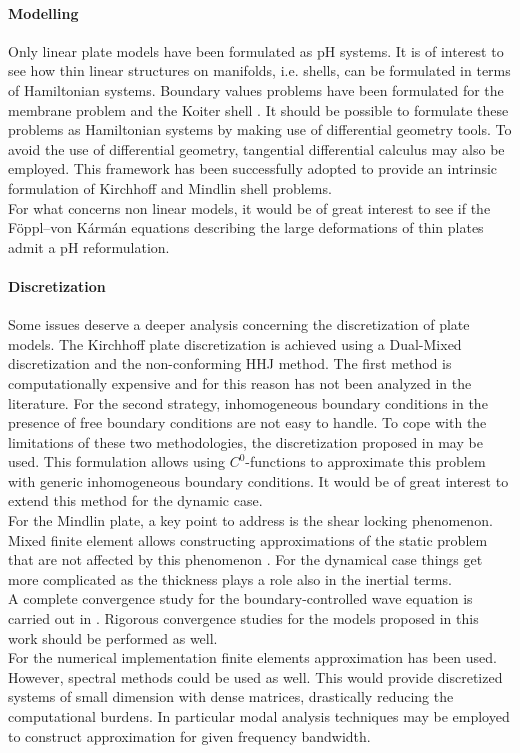 \paragraph{Modelling}
Only linear plate models have been formulated as pH systems. It is of interest to see how thin linear structures on manifolds, i.e. shells, can be formulated in terms of Hamiltonian systems. Boundary values problems have been formulated for the membrane problem and the Koiter shell \cite{ciarlet2000shells}. It should be possible to formulate these problems as Hamiltonian systems by making use of differential geometry tools. To avoid the use of differential geometry, tangential differential calculus \cite{delfour2011shapes} may also be employed. This framework has been successfully adopted to provide an intrinsic formulation of Kirchhoff \cite{schollhammer2019kirchhoff} and Mindlin \cite{schollhammer2019reissner} shell problems. \\
For what concerns non linear models, it would be of great interest to see if the F\"oppl–von K\'arm\'an equations describing the large deformations of thin plates \cite{bilbao2015conservative} admit a pH reformulation. \\


\paragraph{Discretization}
Some issues deserve a deeper analysis concerning the discretization of plate models. The Kirchhoff plate discretization is achieved using a Dual-Mixed discretization and the non-conforming HHJ method. The first method is computationally expensive and for this reason has not been analyzed in the literature. For the second strategy, inhomogeneous boundary conditions in the presence of free boundary conditions are not easy to handle. To cope with the limitations of these two methodologies, the discretization proposed in \cite{rafetseder2018siam} may be used.  This formulation allows using $C^0$-functions to approximate this problem with generic inhomogeneous boundary conditions. It would be of great interest to extend this method for the dynamic case. \\ For the Mindlin plate, a key point to address is the shear locking phenomenon. Mixed finite element allows constructing approximations of the static problem that are not affected by this phenomenon \cite{veiga2013}. For the dynamical case things get more complicated as the thickness plays a role also in the inertial terms. \\ A complete convergence study for the boundary-controlled wave equation is carried out in \cite{haine2020numerical}. Rigorous convergence studies for the models proposed in this work should be performed as well. \\ For the numerical implementation finite elements approximation has been used. However, spectral methods could be used as well. This would provide discretized systems of small dimension with dense matrices, drastically reducing the computational burdens. In particular modal analysis techniques may be employed to construct approximation for given frequency bandwidth.

